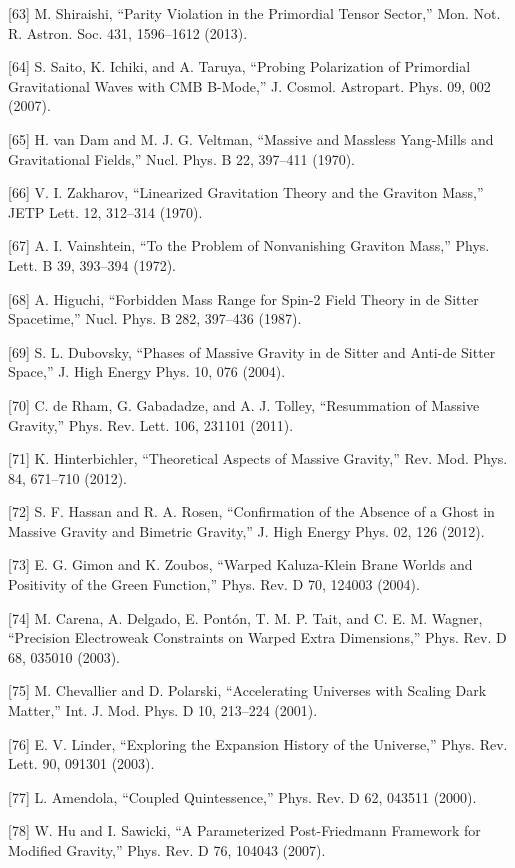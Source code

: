 \documentclass[aps,prd,onecolumn,superscriptaddress,nofootinbib,longbibliography,10pt]{revtex4-2}
\begin{document}
  [63] M. Shiraishi, “Parity Violation in the Primordial Tensor Sector,” Mon. Not. R. Astron. Soc. 431, 1596–1612 (2013).


  [64] S. Saito, K. Ichiki, and A. Taruya, “Probing Polarization of Primordial Gravitational Waves with CMB B-Mode,” J. Cosmol. Astropart. Phys. 09, 002 (2007).


  [65] H. van Dam and M. J. G. Veltman, “Massive and Massless Yang-Mills and Gravitational Fields,” Nucl. Phys. B 22, 397–411 (1970).


  [66] V. I. Zakharov, “Linearized Gravitation Theory and the Graviton Mass,” JETP Lett. 12, 312–314 (1970).


  [67] A. I. Vainshtein, “To the Problem of Nonvanishing Graviton Mass,” Phys. Lett. B 39, 393–394 (1972).


  [68] A. Higuchi, “Forbidden Mass Range for Spin-2 Field Theory in de Sitter Spacetime,” Nucl. Phys. B 282, 397–436 (1987).


  [69] S. L. Dubovsky, “Phases of Massive Gravity in de Sitter and Anti-de Sitter Space,” J. High Energy Phys. 10, 076 (2004).


  [70] C. de Rham, G. Gabadadze, and A. J. Tolley, “Resummation of Massive Gravity,” Phys. Rev. Lett. 106, 231101 (2011).


  [71] K. Hinterbichler, “Theoretical Aspects of Massive Gravity,” Rev. Mod. Phys. 84, 671–710 (2012).


  [72] S. F. Hassan and R. A. Rosen, “Confirmation of the Absence of a Ghost in Massive Gravity and Bimetric Gravity,” J. High Energy Phys. 02, 126 (2012).


  [73] E. G. Gimon and K. Zoubos, “Warped Kaluza-Klein Brane Worlds and Positivity of the Green Function,” Phys. Rev. D 70, 124003 (2004).


  [74] M. Carena, A. Delgado, E. Pontón, T. M. P. Tait, and C. E. M. Wagner, “Precision Electroweak Constraints on Warped Extra Dimensions,” Phys. Rev. D 68, 035010 (2003).


  [75] M. Chevallier and D. Polarski, “Accelerating Universes with Scaling Dark Matter,” Int. J. Mod. Phys. D 10, 213–224 (2001).


  [76] E. V. Linder, “Exploring the Expansion History of the Universe,” Phys. Rev. Lett. 90, 091301 (2003).


  [77] L. Amendola, “Coupled Quintessence,” Phys. Rev. D 62, 043511 (2000).


  [78] W. Hu and I. Sawicki, “A Parameterized Post-Friedmann Framework for Modified Gravity,” Phys. Rev. D 76, 104043 (2007).
\end{document}
